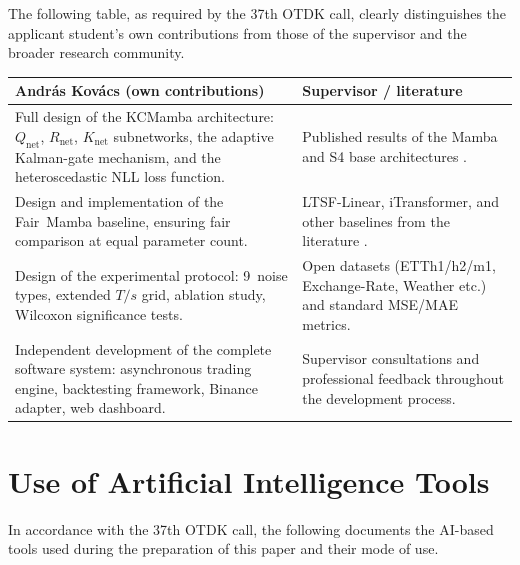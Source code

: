 \documentclass[
]{elteikthesis}[2024/04/26]
\begin{document}
The following table, as required by the 37th OTDK call, clearly distinguishes
the applicant student's own contributions from those of the supervisor
and the broader research community.

\begin{center}
\begin{tabular}{|p{7.0cm}|p{7.0cm}|}
\hline
\textbf{András Kovács (own contributions)} & \textbf{Supervisor / literature} \\
\hline
Full design of the KCMamba architecture:
$Q_\text{net}$, $R_\text{net}$, $K_\text{net}$ subnetworks,
the adaptive Kalman-gate mechanism, and the
heteroscedastic NLL loss function. &
Published results of the Mamba and S4 base architectures
\cite{gu2023mamba,gu2021s4}. \\
\hline
Design and implementation of the Fair~Mamba baseline,
ensuring fair comparison at equal parameter count. &
LTSF-Linear, iTransformer, and other baselines
from the literature \cite{zeng2023transformers,liu2023itransformer}. \\
\hline
Design of the experimental protocol: 9~noise types,
extended $T/s$ grid, ablation study,
Wilcoxon significance tests. &
Open datasets (ETTh1/h2/m1, Exchange-Rate,
Weather etc.) and standard MSE/MAE metrics. \\
\hline
Independent development of the complete software system:
asynchronous trading engine, backtesting framework,
Binance adapter, web dashboard. &
Supervisor consultations and professional feedback
throughout the development process. \\
\hline
\end{tabular}
\end{center}

\appendix

\chapter{Use of Artificial Intelligence Tools}
\label{app:ai}

In accordance with the 37th OTDK call, the following documents the AI-based
tools used during the preparation of this paper and their mode of use.
\end{document}
